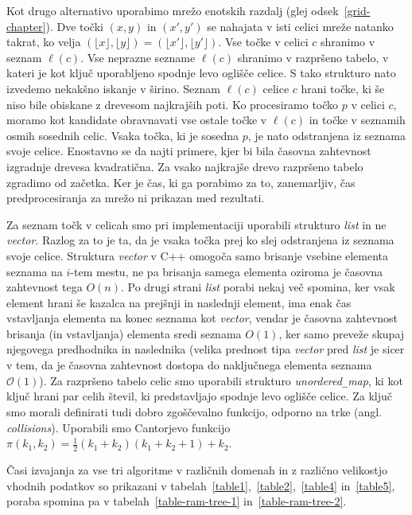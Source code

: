 \documentclass[a4paper, 12pt]{book}
\newcommand{\OO}{\ensuremath{\mathcal{O}}} %
\newcommand{\U}{\texttt{\_}}
\begin{document}
Kot drugo alternativo uporabimo mrežo enotskih razdalj (glej odsek~\ref{grid-chapter}). Dve točki $(x,y)$ in $(x',y')$ se nahajata v isti celici mreže natanko takrat, ko velja $(\lfloor x\rfloor ,\lfloor y\rfloor)=(\lfloor x'\rfloor ,\lfloor y'\rfloor)$. Vse točke v celici $c$ shranimo v seznam $\ell(c)$. Vse neprazne sezname $\ell(c)$ shranimo v razpršeno tabelo, v kateri je kot ključ uporabljeno spodnje levo oglišče celice. S tako strukturo nato izvedemo nekakšno iskanje v širino. Seznam $\ell(c)$ celice $c$ hrani točke, ki še niso bile obiskane z drevesom najkrajših poti. Ko procesiramo točko $p$ v celici $c$, moramo kot kandidate obravnavati vse ostale točke v $\ell(c)$ in točke v seznamih osmih sosednih celic. Vsaka točka, ki je sosedna $p$, je nato odstranjena iz seznama svoje celice. Enostavno se da najti primere, kjer bi bila časovna zahtevnost izgradnje drevesa kvadratična. Za vsako najkrajše drevo razpršeno tabelo zgradimo od začetka. Ker je čas, ki ga porabimo za to, zanemarljiv, čas predprocesiranja za mrežo ni prikazan med rezultati. 

Za seznam točk v celicah smo pri implementaciji uporabili strukturo \textit{list} in ne \textit{vector}. Razlog za to je ta, da je vsaka točka prej ko slej odstranjena iz seznama svoje celice. Struktura \textit{vector} v C++ omogoča samo brisanje vsebine elementa seznama na $i$-tem mestu, ne pa brisanja samega elementa oziroma je časovna zahtevnost tega $O(n)$. Po drugi strani \textit{list} porabi nekaj več spomina, ker vsak element hrani še kazalca na prejšnji in naslednji element, ima enak čas vstavljanja elementa na konec seznama kot \textit{vector}, vendar je časovna zahtevnost brisanja (in vstavljanja) elementa sredi seznama $O(1)$, ker samo preveže skupaj njegovega predhodnika in naslednika (velika prednost tipa \textit{vector} pred \textit{list} je sicer v tem, da je časovna zahtevnost dostopa do naključnega elementa seznama $\OO(1)$). Za razpršeno tabelo celic smo uporabili strukturo \textit{unordered\U map}, ki kot ključ hrani par celih števil, ki predstavljajo spodnje levo oglišče celice. Za ključ smo morali definirati tudi dobro zgoščevalno funkcijo, odporno na trke (angl. \textit{collisions}). Uporabili smo Cantorjevo funkcijo $\pi (k_1, k_2) = \frac{1}{2}(k_1+k_2)(k_1+k_2+1) + k_2$.

Časi izvajanja za vse tri algoritme v različnih domenah in z različno velikostjo vhodnih podatkov so prikazani v tabelah~\ref{table1},~\ref{table2},~\ref{table4} in~\ref{table5}, poraba spomina pa v tabelah~\ref{table-ram-tree-1} in~\ref{table-ram-tree-2}.
\end{document}
